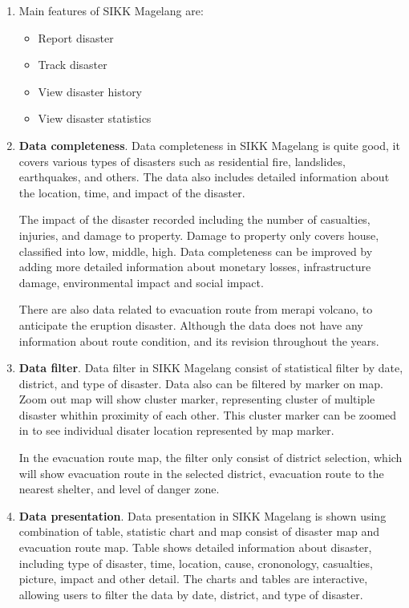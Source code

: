 \documentclass[a4paper,12pt]{article}
\begin{document}
\begin{enumerate}
    \item Main features of SIKK Magelang are:
        \begin{itemize}
            \item Report disaster
            \item Track disaster
            \item View disaster history
            \item View disaster statistics
        \end{itemize}
    

    \item \textbf{Data completeness}.
        Data completeness in SIKK Magelang is quite good, 
        it covers various types of disasters such as residential fire, landslides, earthquakes, and others. 
        The data also includes detailed information about the location, time, and impact of the disaster.

        The impact of the disaster recorded including the number of casualties, injuries, and damage to property.
        Damage to property only covers house, classified into low, middle, high.
        Data completeness can be improved by adding more detailed information about monetary losses, infrastructure damage, environmental impact and social impact.

        There are also data related to evacuation route from merapi volcano, to anticipate the eruption disaster.
        Although the data does not have any information about route condition, and its revision throughout the years.
    \item \textbf{Data filter}.
        Data filter in SIKK Magelang consist of statistical filter by date, district, and type of disaster.
        Data also can be filtered by marker on map. Zoom out map will show cluster marker, representing cluster of multiple disaster whithin proximity of each other. 
        This cluster marker can be zoomed in to see individual disater location represented by map marker.

        In the evacuation route map, the filter only consist of district selection, 
        which will show evacuation route in the selected district, 
        evacuation route to the nearest shelter, and level of danger zone.
    \item \textbf{Data presentation}.
        Data presentation in SIKK Magelang is shown using combination of table, statistic chart and map consist of disaster map and evacuation route map.
        Table shows detailed information about disaster, including type of disaster, time, location, cause, crononology, casualties, picture, impact and other detail.
        The charts and tables are interactive, allowing users to filter the data by date, district, and type of disaster.
        

\end{enumerate}
\end{document}
